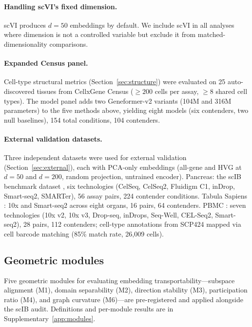 \documentclass[11pt]{article}
\begin{document}
\paragraph{Handling scVI's fixed dimension.} scVI produces $d = 50$ embeddings by default. We include scVI in all analyses where dimension is not a controlled variable but exclude it from matched-dimensionality comparisons.

\paragraph{Expanded Census panel.} Cell-type structural metrics (Section~\ref{sec:structure}) were evaluated on 25 auto-discovered tissues from CellxGene Census ($\geq 200$ cells per assay, $\geq 8$ shared cell types). The model panel adds two Geneformer-v2 variants (104M and 316M parameters) to the five methods above, yielding eight models (six contenders, two null baselines), 154 total conditions, 104 contenders.

\paragraph{External validation datasets.} Three independent datasets were used for external validation (Section~\ref{sec:external}), each with PCA-only embeddings (all-gene and HVG at $d = 50$ and $d = 200$, random projection, untrained encoder). Pancreas: the scIB benchmark dataset \citep{luecken2022scib}, six technologies (CelSeq, CelSeq2, Fluidigm C1, inDrop, Smart-seq2, SMARTer), 56 assay pairs, 224 contender conditions. Tabula Sapiens \citep{tabulasapiens2022}: 10x and Smart-seq2 across eight organs, 16 pairs, 64 contenders. PBMC \citep{ding2020systematic}: seven technologies (10x v2, 10x v3, Drop-seq, inDrops, Seq-Well, CEL-Seq2, Smart-seq2), 28 pairs, 112 contenders; cell-type annotations from SCP424 mapped via cell barcode matching (85\% match rate, 26{,}009 cells).

\subsection{Geometric modules}

Five geometric modules for evaluating embedding transportability---subspace alignment (M1), domain separability (M2), direction stability (M3), participation ratio (M4), and graph curvature (M6)---are pre-registered and applied alongside the scIB audit. Definitions and per-module results are in Supplementary~\ref{app:modules}.
\end{document}
